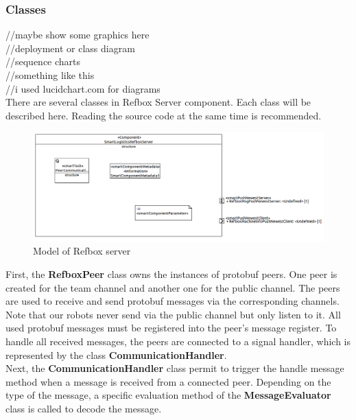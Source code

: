 \subsubsection{Classes}

//maybe show some graphics here \\
//deployment or class diagram  \\
//sequence charts  \\
//something like this \\

//i used lucidchart.com for diagrams \\

There are several classes in Refbox Server component. Each class will be described here. Reading the source code at the same time is recommended.\\

\begin{figure}[!h]
\centering
\includegraphics[width=\linewidth]{pic/component_refbox_server.png}
\caption{Model of Refbox server}
\label{fig:modelRefboxServer}
\end{figure}

First, the \textbf{RefboxPeer} class owns the instances of protobuf peers. One peer is created for the team channel and another one for the public channel. The peers are used to receive and send protobuf messages via the corresponding channels. Note that our robots never send via the public channel but only listen to it. All used protobuf messages must be registered into the peer’s message register. To handle all received messages, the peers are connected to a signal handler, which is represented by the class \textbf{CommunicationHandler}. \\

Next, the \textbf{CommunicationHandler} class permit to trigger the handle message method when a message is received from a connected peer. Depending on the type of the message, a specific evaluation method of the \textbf{MessageEvaluator} class is called to decode the message.\\

